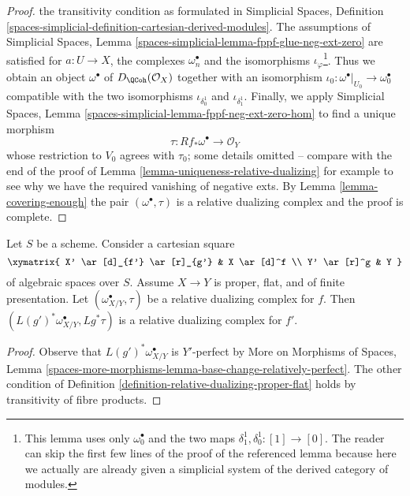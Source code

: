 \begin{proof}
the transitivity condition as formulated in
Simplicial Spaces, Definition
\ref{spaces-simplicial-definition-cartesian-derived-modules}.
The assumptions of Simplicial Spaces, Lemma
\ref{spaces-simplicial-lemma-fppf-glue-neg-ext-zero}
are satisfied for $a : U \to X$, the complexes $\omega_n^\bullet$
and the isomorphisms $\iota_\varphi$\footnote{This lemma uses only
$\omega_0^\bullet$ and the two maps $\delta_1^1, \delta_0^1 : [1] \to [0]$.
The reader can skip the first few lines of the proof of the
referenced lemma
because here we actually are already given a simplicial system of
the derived category of modules.}.
Thus we obtain an object $\omega^\bullet$ of $D_\QCoh(\mathcal{O}_X)$
together with an isomorphism
$\iota_0 : \omega^\bullet|_{U_0} \to \omega_0^\bullet$
compatible with the two isomorphisms
$\iota_{\delta^1_0}$ and $\iota_{\delta^1_1}$.
Finally, we apply
Simplicial Spaces, Lemma
\ref{spaces-simplicial-lemma-fppf-neg-ext-zero-hom}
to find a unique morphism
$$
\tau : Rf_*\omega^\bullet \longrightarrow \mathcal{O}_Y
$$
whose restriction to $V_0$ agrees with $\tau_0$; some details omitted --
compare with the end of the  proof of
Lemma \ref{lemma-uniqueness-relative-dualizing}
for example to see why we have
the required vanishing of negative exts.
By Lemma \ref{lemma-covering-enough}
the pair $(\omega^\bullet, \tau)$ is a relative dualizing complex
and the proof is complete.
\end{proof}

\begin{lemma}
\label{lemma-base-change-relative-dualizing}
Let $S$ be a scheme. Consider a cartesian square
$$
\xymatrix{
X' \ar[d]_{f'} \ar[r]_{g'} & X \ar[d]^f \\
Y' \ar[r]^g & Y
}
$$
of algebraic spaces over $S$. Assume $X \to Y$ is proper, flat, and
of finite presentation. Let $(\omega_{X/Y}^\bullet, \tau)$ be a
relative dualizing complex for $f$. Then
$(L(g')^*\omega_{X/Y}^\bullet, Lg^*\tau)$ is a relative dualizing
complex for $f'$.
\end{lemma}

\begin{proof}
Observe that $L(g')^*\omega_{X/Y}^\bullet$ is $Y'$-perfect by
More on Morphisms of Spaces, Lemma
\ref{spaces-more-morphisms-lemma-base-change-relatively-perfect}.
The other condition of
Definition \ref{definition-relative-dualizing-proper-flat}
holds by transitivity of fibre products.
\end{proof}








